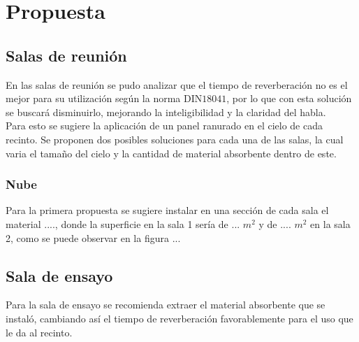\section{Propuesta}
\subsection{Salas de reunión}
En las salas de reunión se pudo analizar que el tiempo de reverberación no es el mejor para su utilización según la norma DIN$18041$, por lo que con esta solución se buscará disminuirlo, mejorando la inteligibilidad y la claridad del habla.\\
Para esto se sugiere la aplicación de un panel ranurado en el cielo de cada recinto. Se proponen dos posibles soluciones para cada una de las salas, la cual varia el tamaño del cielo y la cantidad de material absorbente dentro de este.
\subsubsection{Nube}
Para la primera propuesta se sugiere instalar en una sección de cada sala el material ...., donde la superficie en la sala 1 sería de  ... $m^2$ y de .... $m^2$ en la sala 2, como se puede observar en la figura ...

\subsection{Sala de ensayo}
Para la sala de ensayo se recomienda extraer el material absorbente que se instaló, cambiando así el tiempo de reverberación favorablemente para el uso que le da al recinto.
